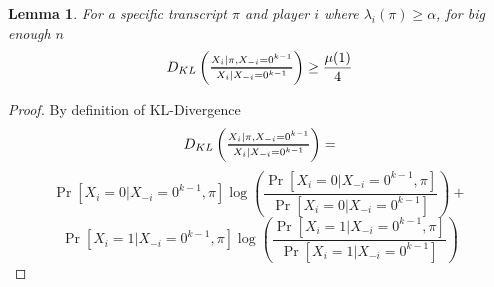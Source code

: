 \documentclass{article}
\newcommand{\Dfrac}[2]{%
  \ooalign{%
    $\genfrac{}{}{1.2pt}1{#1}{#2}$\cr%
    $\color{white}\genfrac{}{}{.4pt}1{\phantom{#1}}{\phantom{#2}}$}%
}
\theoremstyle{plain}
\newtheorem{lemma}[theorem]{Lemma}
\begin{document}
\begin{lemma}
    For a specific transcript $\pi$ and player $i$ where $\lambda_i(\pi) \geq \alpha$, for big enough $n$
    \begin{equation*}
        D_{KL}\left(\Dfrac{X_i | \pi, X_{-i} = 0^{k-1}}{X_i | X_{-i} = 0^{k-1}} \right) \geq \frac{\mu(1)}{4}
    \end{equation*}
\end{lemma}
\begin{proof}
By definition of KL-Divergence
\begin{equation*}
    D_{KL}\left(\Dfrac{X_i | \pi, X_{-i} = 0^{k-1}}{X_i | X_{-i} = 0^{k-1}} \right) = 
\end{equation*}
\begin{equation*}
    \Pr[X_i = 0 | X_{-i}=0^{k-1}, \pi]\log\left(\frac{\Pr[X_i = 0 | X_{-i}=0^{k-1}, \pi]}{\Pr[X_i = 0 | X_{-i}=0^{k-1}]}\right) +
\end{equation*}
\begin{equation*}
    \Pr[X_i = 1 | X_{-i}=0^{k-1}, \pi]\log\left(\frac{\Pr[X_i = 1 | X_{-i}=0^{k-1}, \pi]}{\Pr[X_i = 1 | X_{-i}=0^{k-1}]}\right)
\end{equation*}

\end{proof}
\end{document}

